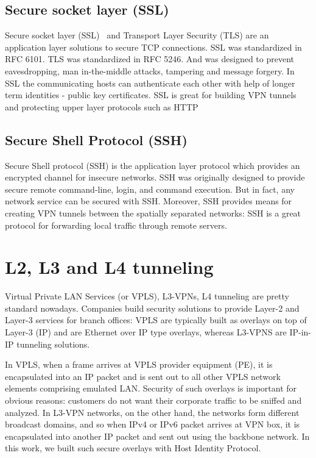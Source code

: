 \subsection{Secure socket layer (SSL)}
Secure socket layer (SSL)~\cite{ssl} and Transport Layer Security (TLS) are an application 
layer solutions to secure TCP connections. SSL was standardized in RFC 6101. 
TLS was standardized in RFC 5246. And was designed to prevent eavesdropping, man 
in-the-middle attacks, tampering and message forgery. In SSL the communicating 
hosts can authenticate each other with help of longer term identities - public key certificates.
SSL is great for building VPN tunnels and protecting upper layer protocols such as HTTP


\subsection{Secure Shell Protocol (SSH)}

Secure Shell protocol (SSH) is the application layer protocol which provides an encrypted channel 
for insecure networks. SSH was originally designed to provide secure remote command-line, login, 
and command execution. But in fact, any network service can be secured with SSH. Moreover, SSH 
provides means for creating VPN tunnels between the spatially separated networks: SSH is a great 
protocol for forwarding local traffic through remote servers. 

\section{L2, L3 and L4 tunneling}

Virtual Private LAN Services (or VPLS), L3-VPNs, L4 tunneling are pretty standard nowadays. 
Companies build security solutions to provide Layer-2 and Layer-3 services for branch offices: 
VPLS are typically built as overlays on top of Layer-3 (IP) and are Ethernet over IP type 
overlays, whereas L3-VPNS are IP-in-IP tunneling solutions.

In VPLS, when a frame arrives at VPLS provider equipment (PE), it is encapsulated 
into an IP packet and is sent out to all other VPLS network elements comprising emulated LAN. 
Security of such overlays is important for obvious reasons: customers do not want their corporate 
traffic to be sniffed and analyzed. In L3-VPN networks, on the other hand, the networks form different 
broadcast domains, and so when IPv4 or IPv6 packet arrives at VPN box, it is encapsulated into another 
IP packet and sent out using the backbone network. In this work, we built such secure overlays with 
Host Identity Protocol. 

